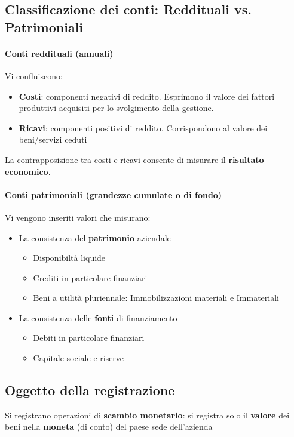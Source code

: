 \documentclass[12pt]{article}
\begin{document}
\subsection{Classificazione dei conti: Reddituali vs. Patrimoniali}
\paragraph{Conti reddituali (annuali)} Vi confluiscono:
\begin{itemize}
    \item \textbf{Costi}: componenti negativi di reddito. Esprimono il valore dei fattori produttivi acquisiti per lo svolgimento della gestione.
    \item \textbf{Ricavi}: componenti positivi di reddito. Corrispondono al valore dei beni/servizi ceduti
\end{itemize}
La contrapposizione tra costi e ricavi consente di misurare il \textbf{risultato economico}.
\paragraph{Conti patrimoniali (grandezze cumulate o di fondo)} Vi vengono inseriti valori che misurano:
\begin{itemize}
    \item La consistenza del \textbf{patrimonio} aziendale
          \begin{itemize}
              \item Disponibiltà liquide
              \item Crediti in particolare finanziari
              \item Beni a utilità pluriennale: Immobilizzazioni materiali e Immateriali
          \end{itemize}
    \item La consistenza delle \textbf{fonti} di finanziamento
          \begin{itemize}
              \item Debiti in particolare finanziari
              \item Capitale sociale e riserve
          \end{itemize}
\end{itemize}
\subsection{Oggetto della registrazione}
Si registrano operazioni di \textbf{scambio monetario}: si registra solo il \textbf{valore} dei beni nella \textbf{moneta} (di conto) del paese sede dell'azienda
\end{document}
